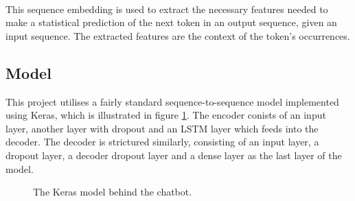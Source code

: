 \documentclass{article}
\begin{document}
\paragraph{}
This sequence embedding is used to extract the necessary features needed to
make a statistical prediction of the next token in an output sequence, given an
input sequence. The extracted features are the context of the token's
occurrences.

\subsection*{Model}
This project utilises a fairly standard sequence-to-sequence model implemented
using Keras, which is illustrated in figure \ref{fig:keras-model}. The encoder
conists of an input layer, another layer with dropout and an LSTM layer which
feeds into the decoder. The decoder is strictured similarly, consisting of an
input layer, a dropout layer, a decoder dropout layer and a dense layer as the
last layer of the model.

\begin{center}
  \begin{figure}[hbt]
    \centering
    \caption{The Keras model behind the chatbot.}
    \label{fig:keras-model}
  \end{figure}
\end{center}
\end{document}
